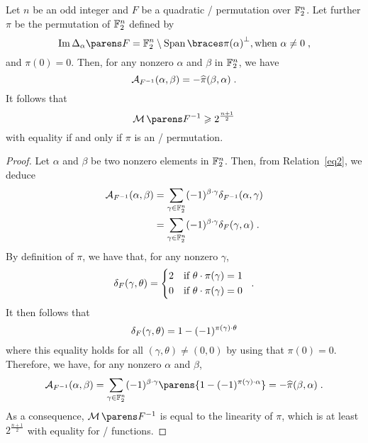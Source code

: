 \begin{proposition}\label{prop:inverse quadratic}
    Let $n$ be an odd integer and $F$ be a quadratic \APN/ permutation over $\mathbb{F}_2^n$.
    Let further $\pi$ be the permutation of $\mathbb{F}_2^n$ defined by
    \begin{equation*}
        \Im{\derive{\alpha}{F}} = \F_2^n \setminus \Span{\pi(\alpha)}^\perp, \text{when } \alpha \neq 0\;,
    \end{equation*}
    and $\pi(0)=0$.
    Then, for any nonzero $\alpha$ and $\beta$ in $\mathbb{F}_2^n$, we have
    \begin{equation*}
        \mathcal{A}_{F^{-1}}(\alpha, \beta) = - \widehat{\pi}(\beta,\alpha)\;.
    \end{equation*}
    It follows that
    \begin{equation*}
        \absoluteindicator{F^{-1}} \geqslant 2^{\frac{n+1}{2}}
    \end{equation*}
    with equality if and only if $\pi$ is an \AB/ permutation.
\end{proposition}
\begin{proof}
    Let $\alpha$ and $\beta$ be two nonzero elements in $\mathbb{F}_2^n$.
    Then, from Relation~\eqref{eq2}, we deduce
    \begin{align*}
        \mathcal{A}_{F^{-1}}(\alpha, \beta)
        &= \sum_{\gamma \in \mathbb{F}_2^n} (-1)^{\beta \cdot \gamma} \delta_{F^{-1}}(\alpha,\gamma)\\
        &= \sum_{\gamma \in \mathbb{F}_2^n} (-1)^{\beta \cdot \gamma} \delta_{F}(\gamma,\alpha)\;.
    \end{align*}
    By definition of $\pi$, we have that, for any nonzero $\gamma$,
    \begin{equation*}
        \DC{F}(\gamma,\theta) = \begin{cases*}
            2 & if $\iprod{\theta}{\pi(\gamma)} = 1$\\
            0 & if $\iprod{\theta}{\pi(\gamma)} = 0$
        \end{cases*}\;.
    \end{equation*}
    It then follows that
    \begin{equation*}
        \delta_{F}(\gamma,\theta) = 1 - (-1)^{\pi(\gamma) \cdot \theta}
    \end{equation*}
    where this equality holds for all $(\gamma, \theta) \neq (0,0)$ by using that $\pi(0)=0$.
    Therefore, we have, for any nonzero $\alpha$ and $\beta$,
    \begin{equation*}
        \AC{F^{-1}}(\alpha, \beta) = \sum_{\gamma \in \F_2^n} (-1)^{\iprod{\beta}{\gamma}} \parens{1 - (-1)^{\iprod{\pi(\gamma)}{\alpha}}} = -\FC{\pi}(\beta, \alpha)\;.
    \end{equation*}
    As a consequence, $\absoluteindicator{F^{-1}}$ is equal to the linearity of $\pi$, which is at least $2^{\frac{n+1}{2}}$ with equality for \AB/ functions.
\end{proof}

